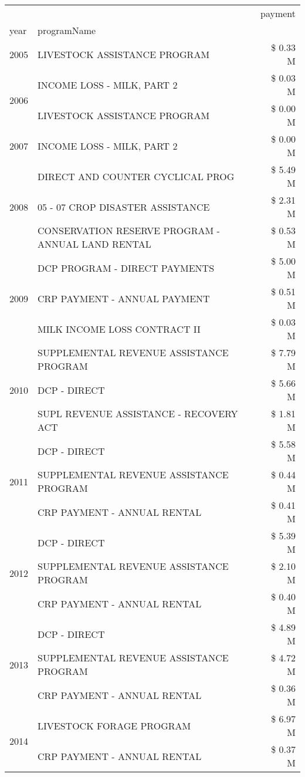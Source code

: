 \begin{tabular}{llr}
\toprule
 &  & payment \\
year & programName &  \\
\midrule
2005 & LIVESTOCK ASSISTANCE PROGRAM & \$ 0.33 M \\
\cline{1-3}
\multirow[t]{2}{*}{2006} & INCOME LOSS - MILK, PART 2 & \$ 0.03 M \\
 & LIVESTOCK ASSISTANCE PROGRAM & \$ 0.00 M \\
\cline{1-3}
2007 & INCOME LOSS - MILK, PART 2 & \$ 0.00 M \\
\cline{1-3}
\multirow[t]{3}{*}{2008} & DIRECT AND COUNTER CYCLICAL PROG & \$ 5.49 M \\
 & 05 - 07 CROP DISASTER ASSISTANCE & \$ 2.31 M \\
 & CONSERVATION RESERVE PROGRAM - ANNUAL LAND RENTAL & \$ 0.53 M \\
\cline{1-3}
\multirow[t]{3}{*}{2009} & DCP PROGRAM - DIRECT PAYMENTS & \$ 5.00 M \\
 & CRP PAYMENT - ANNUAL PAYMENT & \$ 0.51 M \\
 & MILK INCOME LOSS CONTRACT II & \$ 0.03 M \\
\cline{1-3}
\multirow[t]{3}{*}{2010} & SUPPLEMENTAL REVENUE ASSISTANCE PROGRAM & \$ 7.79 M \\
 & DCP - DIRECT & \$ 5.66 M \\
 & SUPL REVENUE ASSISTANCE - RECOVERY ACT & \$ 1.81 M \\
\cline{1-3}
\multirow[t]{3}{*}{2011} & DCP - DIRECT & \$ 5.58 M \\
 & SUPPLEMENTAL REVENUE ASSISTANCE PROGRAM & \$ 0.44 M \\
 & CRP PAYMENT - ANNUAL RENTAL & \$ 0.41 M \\
\cline{1-3}
\multirow[t]{3}{*}{2012} & DCP - DIRECT & \$ 5.39 M \\
 & SUPPLEMENTAL REVENUE ASSISTANCE PROGRAM & \$ 2.10 M \\
 & CRP PAYMENT - ANNUAL RENTAL & \$ 0.40 M \\
\cline{1-3}
\multirow[t]{3}{*}{2013} & DCP - DIRECT & \$ 4.89 M \\
 & SUPPLEMENTAL REVENUE ASSISTANCE PROGRAM & \$ 4.72 M \\
 & CRP PAYMENT - ANNUAL RENTAL & \$ 0.36 M \\
\cline{1-3}
\multirow[t]{3}{*}{2014} & LIVESTOCK FORAGE PROGRAM & \$ 6.97 M \\
 & CRP PAYMENT - ANNUAL RENTAL & \$ 0.37 M \\

\end{tabular}
